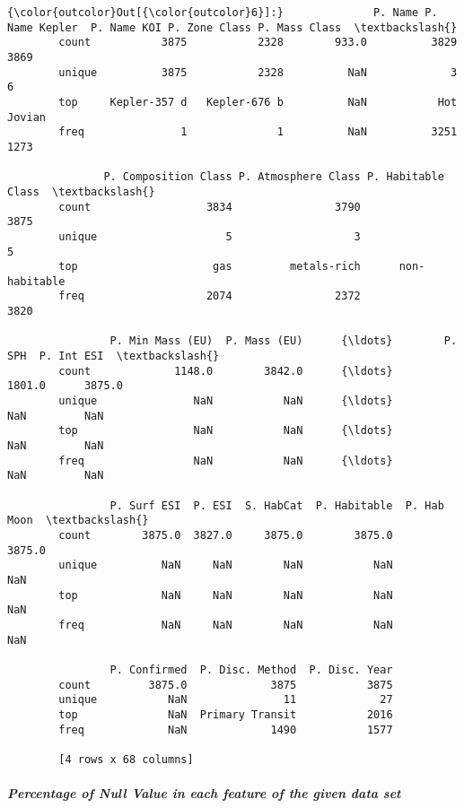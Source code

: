 \documentclass[11pt]{article}
\begin{document}
\begin{Verbatim}[commandchars=\\\{\}]
{\color{outcolor}Out[{\color{outcolor}6}]:}              P. Name P. Name Kepler  P. Name KOI P. Zone Class P. Mass Class  \textbackslash{}
        count           3875           2328        933.0          3829          3869   
        unique          3875           2328          NaN             3             6   
        top     Kepler-357 d   Kepler-676 b          NaN           Hot        Jovian   
        freq               1              1          NaN          3251          1273   
        
               P. Composition Class P. Atmosphere Class P. Habitable Class  \textbackslash{}
        count                  3834                3790               3875   
        unique                    5                   3                  5   
        top                     gas         metals-rich      non-habitable   
        freq                   2074                2372               3820   
        
                P. Min Mass (EU)  P. Mass (EU)      {\ldots}        P. SPH  P. Int ESI  \textbackslash{}
        count             1148.0        3842.0      {\ldots}        1801.0      3875.0   
        unique               NaN           NaN      {\ldots}           NaN         NaN   
        top                  NaN           NaN      {\ldots}           NaN         NaN   
        freq                 NaN           NaN      {\ldots}           NaN         NaN   
        
                P. Surf ESI  P. ESI  S. HabCat  P. Habitable  P. Hab Moon  \textbackslash{}
        count        3875.0  3827.0     3875.0        3875.0       3875.0   
        unique          NaN     NaN        NaN           NaN          NaN   
        top             NaN     NaN        NaN           NaN          NaN   
        freq            NaN     NaN        NaN           NaN          NaN   
        
                P. Confirmed  P. Disc. Method  P. Disc. Year  
        count         3875.0             3875           3875  
        unique           NaN               11             27  
        top              NaN  Primary Transit           2016  
        freq             NaN             1490           1577  
        
        [4 rows x 68 columns]
\end{Verbatim}
            
    \subparagraph{Percentage of Null Value in each feature of the given data
set}\label{percentage-of-null-value-in-each-feature-of-the-given-data-set}
\end{document}
